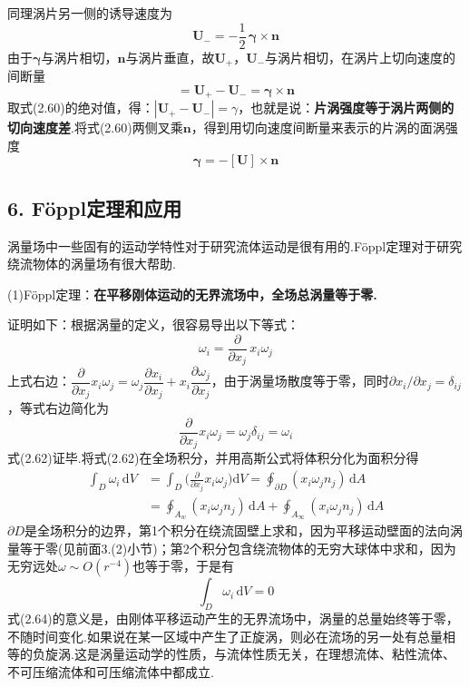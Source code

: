 同理涡片另一侧的诱导速度为
\begin{equation*}
\boldsymbol{U}_{-}=-\frac{1}{2}\,\boldsymbol{\gamma}\times\boldsymbol{n}
\tag{2.59}
\end{equation*}
由于$\boldsymbol{\gamma}$与涡片相切，$\boldsymbol{n}$与涡片垂直，故$\boldsymbol{U}_{+}$，$\boldsymbol{U}_{-}$与涡片相切，在涡片上切向速度的间断量
\begin{equation*}
[\boldsymbol{U}]=\boldsymbol{U}_{+}-\boldsymbol{U}_{-}=\boldsymbol{\gamma}\times\boldsymbol{n}
\tag{2.60}
\end{equation*}
取式(2.60)的绝对值，得：$|\boldsymbol{U}_{+}-\boldsymbol{U}_{-}|=\gamma$，也就是说：\textbf{片涡强度等于涡片两侧的切向速度差}.将式(2.60)两侧叉乘$\boldsymbol{n}$，得到用切向速度间断量来表示的片涡的面涡强度
\begin{equation*}
\boldsymbol{\gamma}=-[\boldsymbol{U}]\times\boldsymbol{n}
\tag{2.61}
\end{equation*}

\subsection*{6. Föppl定理和应用}

涡量场中一些固有的运动学特性对于研究流体运动是很有用的.Föppl定理对于研究绕流物体的涡量场有很大帮助.

(1)Föppl定理：\textbf{在平移刚体运动的无界流场中，全场总涡量等于零.}

证明如下：根据涡量的定义，很容易导出以下等式：
\begin{equation*}
\omega_i=\frac{\partial}{\partial x_j}\,x_i\omega_j
\tag{2.62}
\end{equation*}
上式右边：$\dfrac{\partial}{\partial x_j}x_i\omega_j=\omega_j\dfrac{\partial x_i}{\partial x_j}+x_i\dfrac{\partial\omega_j}{\partial x_j}$，由于涡量场散度等于零，同时$\partial x_i/\partial x_j=\delta_{ij}$，等式右边简化为
\[
\frac{\partial}{\partial x_j}x_i\omega_j=\omega_j\delta_{ij}=\omega_i
\]
式(2.62)证毕.将式(2.62)在全场积分，并用高斯公式将体积分化为面积分得
\begin{align*}
\int_D \omega_i\,\mathrm{d}V&=\int_D \Big(\frac{\partial}{\partial x_j}x_i\omega_j\Big)\mathrm{d}V=\oint_{\partial D}(x_i\omega_j n_j)\,\mathrm{d}A\\
&=\oint_{A_w}(x_i\omega_j n_j)\,\mathrm{d}A+\oint_{A_\infty}(x_i\omega_j n_j)\,\mathrm{d}A
\tag{2.63}
\end{align*}
$\partial D$是全场积分的边界，第1个积分在绕流固壁上求和，因为平移运动壁面的法向涡量等于零(见前面3.(2)小节)；第2个积分包含绕流物体的无穷大球体中求和，因为无穷远处$\omega\sim O(r^{-4})$也等于零，于是有
\begin{equation*}
\int_D \omega_i\,\mathrm{d}V=0
\tag{2.64}
\end{equation*}
式(2.64)的意义是，由刚体平移运动产生的无界流场中，涡量的总量始终等于零，不随时间变化.如果说在某一区域中产生了正旋涡，则必在流场的另一处有总量相等的负旋涡.这是涡量运动学的性质，与流体性质无关，在理想流体、粘性流体、不可压缩流体和可压缩流体中都成立.

